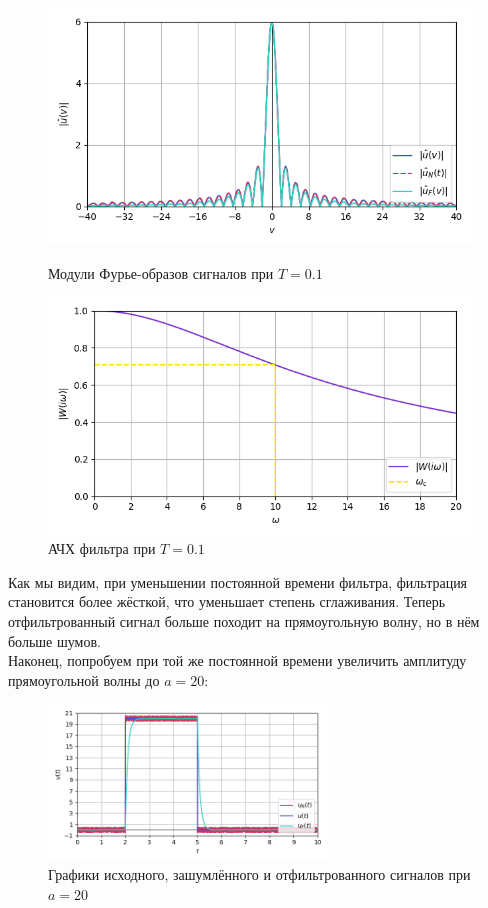 \documentclass[a4paper]{article}
\begin{document}
\begin{figure}[H]
    \begin{minipage}{0.49\textwidth}
        \centering \includegraphics[width=\textwidth]{sources/second/part1/a=5 T=0.1/2_fft_cmp.png}
        \caption{Модули Фурье-образов сигналов при $T = 0.1$}
    \end{minipage}\hfill
    \begin{minipage}{0.49\textwidth}
        \centering \includegraphics[width=\textwidth]{sources/second/part1/a=5 T=0.1/3_filter.png}
        \caption{АЧХ фильтра при $T = 0.1$}
    \end{minipage}
\end{figure}
Как мы видим, при уменьшении постоянной времени фильтра, фильтрация становится более жёсткой, что уменьшает степень сглаживания. Теперь отфильтрованный сигнал больше походит на прямоугольную волну, но в нём больше шумов.\\[0.5em]
Наконец, попробуем при той же постоянной времени увеличить амплитуду прямоугольной волны до $a = 20$:
\begin{figure}[H]
    \centering \includegraphics[width=0.66\textwidth]{sources/second/part1/a=20 T=0.1/1_signal_cmp.png}
    \caption{Графики исходного, зашумлённого и отфильтрованного сигналов при $a = 20$}
\end{figure}\vspace{-1em}
\end{document}
